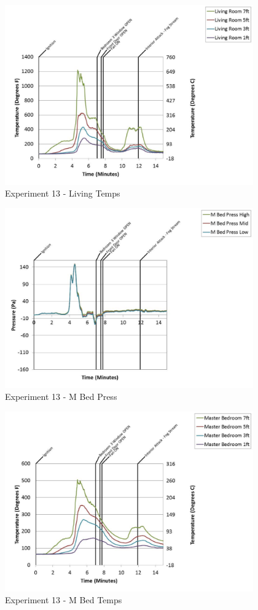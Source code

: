 \documentclass{article}
\begin{document}
\begin{appendices}
	\clearpage

	\begin{figure}[h!]
		\centering
		\includegraphics[height=3.05in]{0_Images/Results_Charts/Exp_13_Charts/LivingTemps.pdf}
		\caption{Experiment 13 - Living Temps}
	\end{figure}
 

	\begin{figure}[h!]
		\centering
		\includegraphics[height=3.05in]{0_Images/Results_Charts/Exp_13_Charts/MBedPress.pdf}
		\caption{Experiment 13 - M Bed Press}
	\end{figure}
 
	\clearpage

	\begin{figure}[h!]
		\centering
		\includegraphics[height=3.05in]{0_Images/Results_Charts/Exp_13_Charts/MBedTemps.pdf}
		\caption{Experiment 13 - M Bed Temps}
	\end{figure}
 


\end{appendices}
\end{document}
